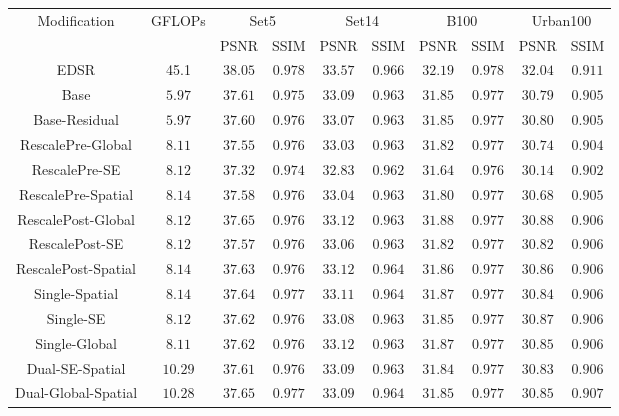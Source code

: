 \documentclass{article}
\begin{document}
\begin{table}[t]
    \centering
    \begin{tabular}{ |c|c|c|c|c|c|c|c|c|c| } 
     \hline
      \multirow{2}{*}{Modification} & \multirow{2}{*}{GFLOPs} & \multicolumn{2}{c}{Set5} & \multicolumn{2}{c}{Set14} & \multicolumn{2}{c}{B100} & \multicolumn{2}{c}{Urban100} \vline\\ 
      
        & & PSNR & SSIM & PSNR & SSIM & PSNR & SSIM & PSNR & SSIM \\ 
        EDSR & 45.1 & $38.05$ & $0.978$ & $33.57$ & $0.966$ & $32.19$ & $0.978$ & $32.04$ & $0.911$ \\
        Base & $5.97$ & $37.61$ & $0.975$ & $33.09$ & $0.963$ & $31.85$ & $0.977$ & $30.79$ & $0.905$ \\
        Base-Residual & $5.97$ & $37.60$ & $0.976$ & $33.07$ & $0.963$ & $31.85$ & $0.977$ & $30.80$ & $0.905$ \\
        RescalePre-Global & $8.11$ & $37.55$ & $0.976$ & $33.03$ & $0.963$ & $31.82$ & $0.977$ & $30.74$ & $0.904$ \\
        RescalePre-SE & $8.12$ & $37.32$ & $0.974$ & $32.83$ & $0.962$ & $31.64$ & $0.976$ & $30.14$ & $0.902$ \\
        RescalePre-Spatial & $8.14$ & $37.58$ & $0.976$ & $33.04$ & $0.963$ & $31.80$ & $0.977$ & $30.68$ & $0.905$ \\
        RescalePost-Global & $8.12$ & $37.65$ & $0.976$ & $33.12$ & $0.963$ & $31.88$ & $0.977$ & $30.88$ & $0.906$ \\
        RescalePost-SE & $8.12$ & $37.57$ & $0.976$ & $33.06$ & $0.963$ & $31.82$ & $0.977$ & $30.82$ & $0.906$ \\
        RescalePost-Spatial & $8.14$ & $37.63$ & $0.976$ & $33.12$ & $0.964$ & $31.86$ & $0.977$ & $30.86$ & $0.906$ \\
        Single-Spatial & $8.14$ & $37.64$ & $\mathbf{0.977}$ & $33.11$ & $0.964$ & $31.87$ & $0.977$ & $30.84$ & $0.906$ \\
        Single-SE & $8.12$ & $37.62$ & $0.976$ & $33.08$ & $0.963$ & $31.85$ & $0.977$ & $30.87$ & $0.906$ \\
        Single-Global & $8.11$ & $37.62$ & $0.976$ & $33.12$ & $0.963$ & $31.87$ & $0.977$ & $30.85$ & $0.906$ \\
        Dual-SE-Spatial & $10.29$ & $37.61$ & $0.976$ & $33.09$ & $0.963$ & $31.84$ & $0.977$ & $30.83$ & $0.906$ \\
        Dual-Global-Spatial & $10.28$ & $37.65$ & $\mathbf{0.977}$ & $33.09$ & $0.964$ & $31.85$ & $0.977$ & $30.85$ & $0.907$ \\

\end{tabular}
\end{table}
\end{document}
